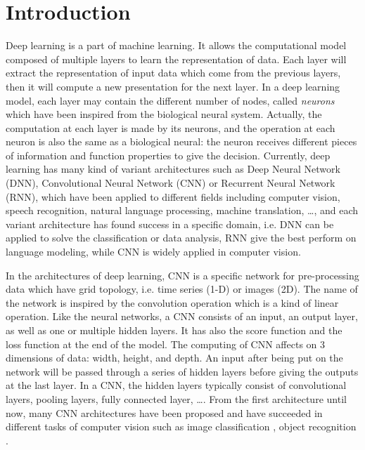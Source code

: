 \documentclass[review]{elsarticle}
\begin{document}
\linenumbers

\section{Introduction}
\label{sIntroduction}
Deep learning is a part of machine learning. It allows the computational model composed of multiple layers to learn the representation of data. Each layer will extract the representation of input data which come from the previous layers, then it will compute a new presentation for the next layer. In a deep learning model, each layer may contain the different number of nodes, called \textit{neurons} which have been inspired from the biological neural system. Actually, the computation at each layer is made by its neurons, and the operation at each neuron is also the same as a biological neural: the neuron receives different pieces of information and function properties to give the decision. Currently, deep learning has many kind of variant architectures such as Deep Neural Network (DNN), Convolutional Neural Network (CNN) or Recurrent Neural Network (RNN), which have been applied to different fields including computer vision, speech recognition, natural language processing, machine translation, \ldots, and each variant architecture has found success in a specific domain, i.e. DNN can be applied to solve the classification or data analysis, RNN give the best perform on language modeling, while CNN is widely applied in computer vision.

In the architectures of deep learning, CNN is a specific network for pre-processing data which have grid topology, i.e. time series (1-D) or images (2D). The name of the network is inspired by the convolution operation which is a kind of linear operation. Like the neural networks, a CNN consists of an input, an output layer, as well as one or multiple hidden layers. It has also the score function and the loss function at the end of the model. The computing of CNN affects on $3$ dimensions of data: width, height, and depth. An input after being put on the network will be passed through a series of hidden layers before giving the outputs at the last layer. In a CNN, the hidden layers typically consist of convolutional layers, pooling layers, fully connected layer, \ldots. From the first architecture \cite{lecun1998gradient} until now, many CNN architectures have been proposed and have succeeded in different tasks of computer vision such as image classification \cite{lecun1998gradient, krizhevsky2012imagenet,szegedy2015going}, object recognition \cite{szegedy2015going,farabet2013learning,li2015convolutional}.
\end{document}
